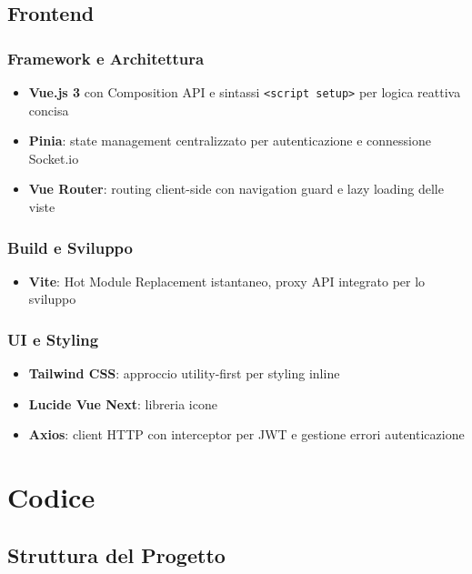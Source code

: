 \documentclass{report}
\begin{document}
\section{Frontend}

\subsection{Framework e Architettura}
\begin{itemize}
    \item \textbf{Vue.js 3} con Composition API e sintassi \texttt{<script setup>} per logica reattiva concisa
    \item \textbf{Pinia}: state management centralizzato per autenticazione e connessione Socket.io
    \item \textbf{Vue Router}: routing client-side con navigation guard e lazy loading delle viste
\end{itemize}

\subsection{Build e Sviluppo}
\begin{itemize}
    \item \textbf{Vite}: Hot Module Replacement istantaneo, proxy API integrato per lo sviluppo
\end{itemize}

\subsection{UI e Styling}
\begin{itemize}
    \item \textbf{Tailwind CSS}: approccio utility-first per styling inline
    \item \textbf{Lucide Vue Next}: libreria icone
    \item \textbf{Axios}: client HTTP con interceptor per JWT e gestione errori autenticazione
\end{itemize}

\chapter{Codice}

\section{Struttura del Progetto}
\end{document}
